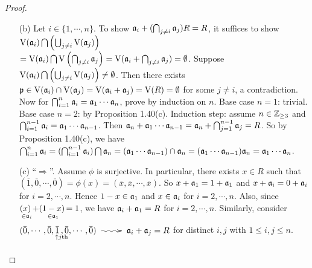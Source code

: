 \begin{proof}
    \begin{enumerate}
        \item [(b)]
            Let $i \in \{1,\cdots,n\}$. To show $\mathfrak{a}_i + (\bigcap_{j \neq i}\mathfrak{a}_j)R = R$, it suffices to show $\operatorname{V}(\mathfrak{a}_i) \bigcap \left(\bigcup_{j \neq i} \operatorname{V}(\mathfrak{a}_j)\right)$ \\ 
            $=\operatorname{V}(\mathfrak{a}_i) \bigcap \operatorname{V}\left(\bigcap_{j \neq i} \mathfrak{a}_j\right) = \operatorname{V}(\mathfrak{a}_i + \bigcap_{j \neq i} \mathfrak{a}_j) = \emptyset$. Suppose $\operatorname{V}(\mathfrak{a}_i) \bigcap \left(\bigcup_{j \neq i}\operatorname{V}(\mathfrak{a}_j)\right) \neq \emptyset$. Then there exists $\mathfrak{p} \in \operatorname{V}(\mathfrak{a}_i) \cap \operatorname{V}(\mathfrak{a}_j) = \operatorname{V}(\mathfrak{a}_i + \mathfrak{a}_j) = \operatorname{V}(R) = \emptyset$ for some $j \neq i$, a contradiction. \\
            Now for $\bigcap_{i=1}^n \mathfrak{a}_i = \mathfrak{a}_1 \cdots \mathfrak{a}_n$, prove by induction on $n$. Base case $n = 1$: trivial. Base case $n = 2$: by Proposition 1.40(c). Induction step: assume $n \in \mathbb{Z}_{\geq 3}$ and $\bigcap_{i=1}^{n-1}\mathfrak{a}_i = \mathfrak{a}_1 \cdots \mathfrak{a}_{n-1}$. Then $\mathfrak{a}_n + \mathfrak{a}_1 \cdots \mathfrak{a}_{n-1} = \mathfrak{a}_n + \bigcap_{j=1}^{n-1} \mathfrak{a}_j = R$. So by Proposition 1.40(c), we have $\bigcap_{i=1}^n \mathfrak{a}_i = (\bigcap_{i=1}^{n-1} \mathfrak{a}_i) \bigcap \mathfrak{a}_n = (\mathfrak{a}_1 \cdots \mathfrak{a}_{n-1}) \cap \mathfrak{a}_n = (\mathfrak{a}_1 \cdots \mathfrak{a}_{n-1})\mathfrak{a}_n = \mathfrak{a}_1 \cdots \mathfrak{a}_n$. 
        \item [(c)]
            ``$\Rightarrow$''. Assume $\phi$ is surjective. In particular, there exists $x \in R$ such that $(\overbar 1,\overbar 0,\cdots,\overbar 0) = \phi(x) = (\overbar x, \overbar x, \cdots, \overbar x)$. So $x+\mathfrak{a}_1 = 1+\mathfrak{a}_1$ and $x+\mathfrak{a}_i = 0 + \mathfrak{a}_i$ for $i = 2,\cdots,n$. Hence $1-x \in \mathfrak{a}_1$ and $x \in \mathfrak{a}_i$ for $i = 2,\cdots,n$. Also, since $\mathpunct{\underset{\mathclap{\substack{\ \in \ffa_i \\ \textstyle }}}{(x)}} + \mathpunct{\underset{\mathclap{\substack{\ \in \ffa_1 \\ \textstyle }}}{(1-x)}} = 1$, we have $\mathfrak{a}_i + \mathfrak{a}_1 = R$ for $i = 2,\cdots, n$. Similarly, consider $(\overbar 0, \cdots, \overbar 0, \mathpunct{\underset{\mathclap{\substack{\ \ \ \uparrow j\text{th} \\ \textstyle }}}{\overbar 1}}, \overbar 0, \cdots, \overbar 0) \xymatrix{{}\ar@{~>}[r]&{}} \ffa_i + \ffa_j = R$ for distinct $i,j$ with $1 \leq i,j \leq n$. \\

\end{enumerate}
\end{proof}

